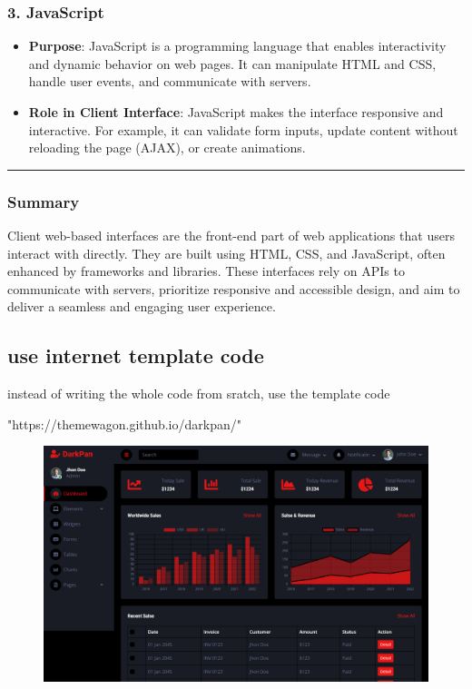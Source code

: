 \documentclass[11pt]{article}
\makeatletter
\def\maxwidth{\ifdim\Gin@nat@width>\linewidth\linewidth
    \else\Gin@nat@width\fi}
\let\Oldincludegraphics\includegraphics
\renewcommand{\includegraphics}[1]{\Oldincludegraphics[width=.8\maxwidth]{#1}}
\providecommand{\tightlist}{%
      \setlength{\itemsep}{0pt}\setlength{\parskip}{0pt}}
\makeatother
\begin{document}
\subsubsection{\texorpdfstring{3.
\textbf{JavaScript}}{3. JavaScript}}\label{javascript}

\begin{itemize}
\tightlist
\item
  \textbf{Purpose}: JavaScript is a programming language that enables
  interactivity and dynamic behavior on web pages. It can manipulate
  HTML and CSS, handle user events, and communicate with servers.
\item
  \textbf{Role in Client Interface}: JavaScript makes the interface
  responsive and interactive. For example, it can validate form inputs,
  update content without reloading the page (AJAX), or create
  animations.
\end{itemize}

\begin{center}\rule{0.5\linewidth}{\linethickness}\end{center}

\subsubsection{Summary}\label{summary}

Client web-based interfaces are the front-end part of web applications
that users interact with directly. They are built using HTML, CSS, and
JavaScript, often enhanced by frameworks and libraries. These interfaces
rely on APIs to communicate with servers, prioritize responsive and
accessible design, and aim to deliver a seamless and engaging user
experience.

    \subsection{use internet template
code}\label{use-internet-template-code}

instead of writing the whole code from sratch, use the template code

"https://themewagon.github.io/darkpan/"

\begin{figure}
\centering
\includegraphics{img/Darkpen.png}
\caption{}
\end{figure}
\end{document}
